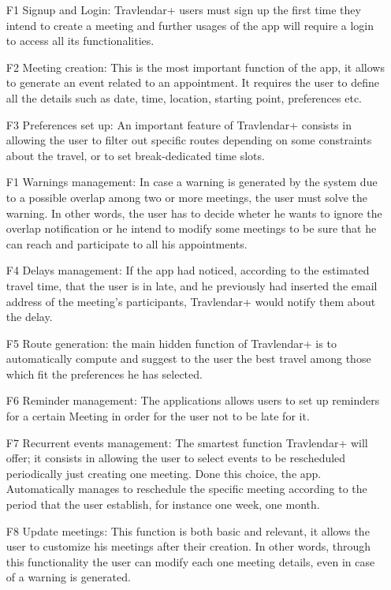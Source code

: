 
\begin{itemize}

\item[\hypertarget{F1}{F1}] Signup and Login: Travlendar+ users must sign up the first time they intend to create a meeting and further usages of the app will require a login to access all its functionalities.
\item[\hypertarget{F2}{F2}] Meeting creation: This is the most important function of the app, it allows to generate an event related to an appointment. It requires the user to define all the details such as date, time, location, starting point, preferences etc. 
\item[\hypertarget{F3}{F3}] Preferences set up: An important feature of Travlendar+ consists in allowing the user to filter out specific routes depending on some constraints about the travel, or to set break-dedicated time slots.
\item[\hypertarget{F1}{F1}] Warnings management: In case a warning is generated by the system due to a possible overlap among two or more meetings, the user must solve the warning. In other words, the user has to decide wheter he wants to ignore the overlap notification or he intend to modify some meetings to be sure that he can reach and participate to all his appointments.
\item[\hypertarget{F4}{F4}] Delays management:  If the app had noticed, according to the estimated travel time, that the user is in late, and he previously had inserted the email address of the meeting’s participants, Travlendar+ would notify them about the delay. 
\item[\hypertarget{F5}{F5}] Route generation: the main hidden function of Travlendar+ is to automatically compute and suggest to the user the best travel among those which fit the preferences he has selected.
\item[\hypertarget{F6}{F6}] Reminder management: The applications allows users to set up reminders for a certain Meeting in order for the user not to be late for it.

\item[\hypertarget{F7}{F7}] Recurrent events management: The smartest function Travlendar+ will offer; it consists in allowing the user to select events to be rescheduled periodically just creating one meeting. Done this choice, the app. Automatically manages to  reschedule the specific meeting according to the period that the user establish, for instance one week, one month.
\item[\hypertarget{F8}{F8}] Update meetings: This function is both basic and relevant, it allows the user to customize his meetings after their creation. In other words, through this functionality the user can modify each one meeting details, even in case of a warning is generated.


\end{itemize}

 
